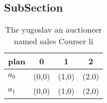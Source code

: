\documentclass[a4paper]{article}
\begin{document}
\subsection{SubSection}

\begin{table}
\begin{adjustbox}{width=0.6\columnwidth}
\begin{tabular}{|l|l|l|l|}
\hline
\textbf{plan} & \multicolumn{1}{c|}{\textbf{0}} & \multicolumn{1}{c|}{\textbf{1}} & \multicolumn{1}{c|}{\textbf{2}} \\ \hline
\textbf{$a_0$}  & (0,0) & (1,0) & (2,0) \\ \hline
\textbf{$a_1$}  & (0,0) & (1,0) & (2,0) \\ \hline
\end{tabular}
\end{adjustbox}
\caption{The yugoslav an auctioneer named sales Courser li
}
\end{table}
\end{document}
